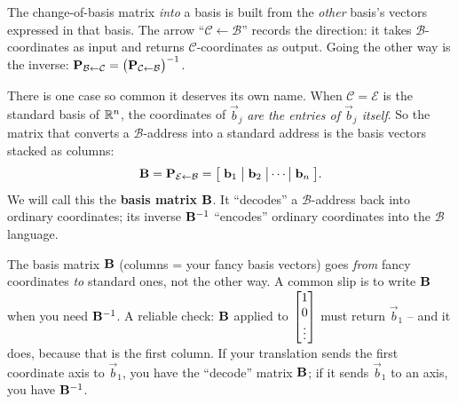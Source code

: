 \begin{focusbox}
The change-of-basis matrix \emph{into} a basis is built from the \emph{other}
basis's vectors expressed in that basis. The arrow ``$\mathcal{C}\leftarrow\mathcal{B}$''
records the direction: it takes $\mathcal{B}$-coordinates as input and returns
$\mathcal{C}$-coordinates as output. Going the other way is the inverse:
$\mathbf{P}_{\mathcal{B}\leftarrow\mathcal{C}}=\big(\mathbf{P}_{\mathcal{C}\leftarrow\mathcal{B}}\big)^{-1}$.
\end{focusbox}

There is one case so common it deserves its own name. When $\mathcal{C}=\mathcal{E}$
is the standard basis of $\mathbb{R}^n$, the coordinates of $\vec{b}_j$ \emph{are the
entries of $\vec{b}_j$ itself}. So the matrix that converts a $\mathcal{B}$-address into a
standard address is the basis vectors stacked as columns:
\[
  \mathbf{B} = \mathbf{P}_{\mathcal{E}\leftarrow\mathcal{B}}
  = \big[\;\mathbf{b}_1\;\big|\;\mathbf{b}_2\;\big|\cdots\big|\;\mathbf{b}_n\;\big].
\]
We will call this the \textbf{basis matrix} $\mathbf{B}$. It ``decodes'' a
$\mathcal{B}$-address back into ordinary coordinates; its inverse $\mathbf{B}^{-1}$
``encodes'' ordinary coordinates into the $\mathcal{B}$ language.

\begin{trapbox}
The basis matrix $\mathbf{B}$ (columns = your fancy basis vectors) goes \emph{from}
fancy coordinates \emph{to} standard ones, not the other way. A common slip is to
write $\mathbf{B}$ when you need $\mathbf{B}^{-1}$. A reliable check: $\mathbf{B}$ applied
to $\begin{bmatrix}1\\0\\\vdots\end{bmatrix}$ must return $\vec{b}_1$ -- and it does, because that is
the first column. If your translation sends the first coordinate axis to $\vec{b}_1$,
you have the ``decode'' matrix $\mathbf{B}$; if it sends $\vec{b}_1$ to an axis, you
have $\mathbf{B}^{-1}$.
\end{trapbox}

